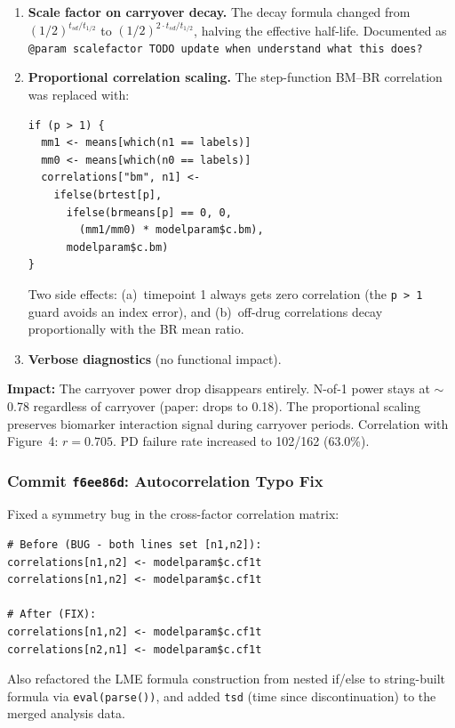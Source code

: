 \documentclass[11pt]{article}
\begin{document}
\begin{enumerate}
\item \textbf{Scale factor on carryover decay.} The decay
  formula changed from
  $(1/2)^{t_{sd}/t_{1/2}}$ to
  $(1/2)^{2 \cdot t_{sd}/t_{1/2}}$,
  halving the effective half-life. Documented as
  \texttt{@param scalefactor TODO update when understand
  what this does?}

\item \textbf{Proportional correlation scaling.} The
  step-function BM--BR correlation was replaced with:

\begin{verbatim}
if (p > 1) {
  mm1 <- means[which(n1 == labels)]
  mm0 <- means[which(n0 == labels)]
  correlations["bm", n1] <-
    ifelse(brtest[p],
      ifelse(brmeans[p] == 0, 0,
        (mm1/mm0) * modelparam$c.bm),
      modelparam$c.bm)
}
\end{verbatim}

  Two side effects: (a)~timepoint 1 always gets zero
  correlation (the \texttt{p > 1} guard avoids an index
  error), and (b)~off-drug correlations decay
  proportionally with the BR mean ratio.

\item \textbf{Verbose diagnostics} (no functional impact).
\end{enumerate}

\textbf{Impact:} The carryover power drop disappears
entirely. N-of-1 power stays at $\sim$0.78 regardless of
carryover (paper: drops to 0.18). The proportional scaling
preserves biomarker interaction signal during carryover
periods. Correlation with Figure~4: $r = 0.705$.
PD failure rate increased to 102/162 (63.0\%).

\subsubsection{Commit \texttt{f6ee86d}: Autocorrelation
              Typo Fix}

Fixed a symmetry bug in the cross-factor correlation
matrix:

\begin{verbatim}
# Before (BUG - both lines set [n1,n2]):
correlations[n1,n2] <- modelparam$c.cf1t
correlations[n1,n2] <- modelparam$c.cf1t

# After (FIX):
correlations[n1,n2] <- modelparam$c.cf1t
correlations[n2,n1] <- modelparam$c.cf1t
\end{verbatim}

Also refactored the LME formula construction from nested
if/else to string-built formula via \texttt{eval(parse())},
and added \texttt{tsd} (time since discontinuation) to the
merged analysis data.
\end{document}
